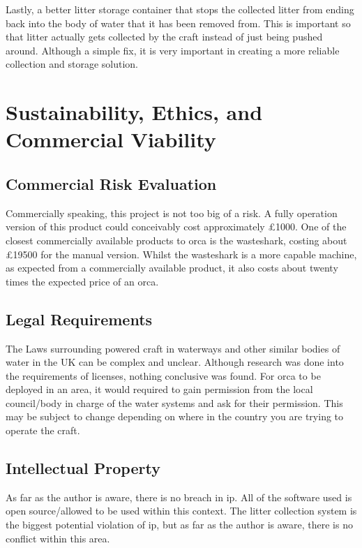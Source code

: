 \documentclass [12pt]{article}
\begin{document}
Lastly, a better litter storage container that stops the collected litter from ending back into the body of water that it has been removed from. This is important so that litter actually gets collected by the craft instead of just being pushed around. Although a simple fix, it is very important in creating a more reliable collection and storage solution.  

\section{Sustainability, Ethics, and Commercial Viability}

\subsection{Commercial Risk Evaluation}
Commercially speaking, this project is not too big of a risk. A fully operation version of this product could conceivably cost approximately £1000. One of the closest commercially available products to \gls{orca} is the wasteshark, costing about £19500 for the manual version. Whilst the wasteshark is a more capable machine, as expected from a commercially available product, it also costs about twenty times the expected price of an \gls{orca}.


\subsection{Legal Requirements}
The Laws surrounding powered craft in waterways and other similar bodies of water in the UK can be complex and unclear. Although research was done into the requirements of licenses, nothing conclusive was found. For \gls{orca} to be deployed in an area, it would required to gain permission from the local council/body in charge of the water systems and ask for their permission. This may be subject to change depending on where in the country you are trying to operate the craft. 

\subsection{Intellectual Property}
As far as the author is aware, there is no breach in \gls{ip}. All of the software used is open source/allowed to be used within this context. The litter collection system is the biggest potential violation of \gls{ip}, but as far as the author is aware, there is no conflict within this area.
\end{document}
